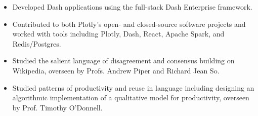 \documentclass[10pt,ragged2e]{altacv}
\begin{document}
\divider

\begin{itemize}
\item Developed Dash applications using the full-stack Dash Enterprise framework.
\item Contributed to both Plotly’s open- and closed-source software projects and worked with tools including Plotly, Dash, React, Apache Spark, and Redis/Postgres.
\end{itemize}

\begin{itemize}
\item Studied the salient language of disagreement and consensus building on Wikipedia, overseen by Profs. Andrew Piper and Richard Jean So.
\end{itemize}

\divider

\begin{itemize}
\item Studied patterns of productivity and reuse in language including designing an algorithmic implementation of a qualitative model for productivity, overseen by Prof. Timothy O'Donnell.
\end{itemize}


\clearpage
\end{document}
